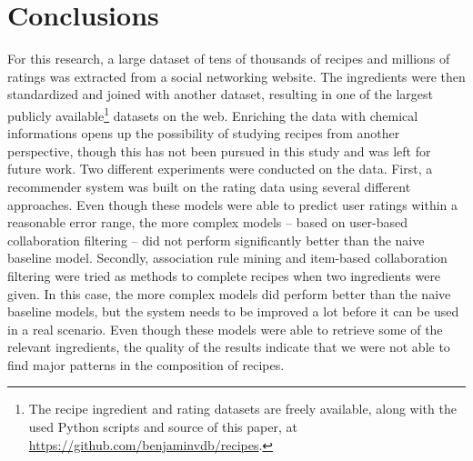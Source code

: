 \section{Conclusions}
\label{sec:conclusions}

For this research, a large dataset of tens of thousands of recipes and millions of ratings was extracted from a social networking website.
The ingredients were then standardized and joined with another dataset, resulting in one of the largest publicly available\footnote{The recipe ingredient and rating datasets are freely available, along with the used Python scripts and \latex source of this paper, at \url{https://github.com/benjaminvdb/recipes}.} datasets on the web.
Enriching the data with chemical informations opens up the possibility of studying recipes from another perspective, though this has not been pursued in this study and was left for future work.
Two different experiments were conducted on the data.
First, a recommender system was built on the rating data using several different approaches.
Even though these models were able to predict user ratings within a reasonable error range, the more complex models -- based on user-based collaboration filtering -- did not perform significantly better than the naive baseline model.
Secondly, association rule mining and item-based collaboration filtering were tried as methods to complete recipes when two ingredients were given.
In this case, the more complex models did perform better than the naive baseline models, but the system needs to be improved a lot before it can be used in a real scenario.
Even though these models were able to retrieve some of the relevant ingredients, the quality of the results indicate that we were not able to find major patterns in the composition of recipes.